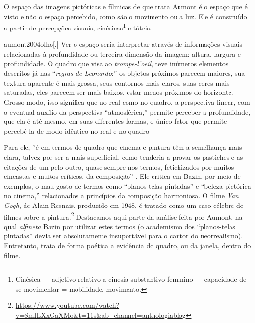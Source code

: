 O espaço das imagens pictóricas e fílmicas de que trata Aumont é o
espaço que é visto e não o espaço percebido, como são o movimento ou a
luz. Ele é construído a partir de percepções visuais,
cinésicas\footnote{Cinésica --- adjetivo relativo a cinesia-substantivo
	feminino --- capacidade de se movimentar = mobilidade, movimento.} e
táteis.

\begin{displaycquote}[113]{aumont2004olho}[.]
	Ver o espaço seria interpretar através de informações visuais
	relacionadas à profundidade ou terceira dimensão da imagem: altura,
	largura e profundidade. O quadro que visa ao \emph{trompe-l'oeil}, teve
	inúmeros elementos descritos já nas \enquote{\emph{regras de Leonardo}:} os
	objetos próximos parecem maiores, sua textura aparente é mais grossa,
	seus contornos mais claros, suas cores mais saturadas, eles parecem ser
	mais baixos, estar menos próximos do horizonte. Grosso modo, isso
	significa que no real como no quadro, a perspectiva linear, com o
	eventual auxílio da perspectiva \enquote{atmosférica,} permite perceber a
	profundidade, que ela é até mesmo, em suas diferentes formas, o único
	fator que permite percebê-la de modo idêntico no real e no quadro
\end{displaycquote}

Para ele, \enquote{é em termos de quadro que cinema e pintura têm a
	semelhança mais clara, talvez por ser a mais superficial, como tenderia
	a provar os pastiches e as citações de um pelo outro, quase sempre nos
	termos, fetichizados por muitos cineastas e muitos críticos, da
	composição} \parencite[123]{aumont2004olho}. Ele critica em Bazin, por meio de
exemplos, o mau gosto de termos como \enquote{planos-telas pintadas} e
\enquote{beleza pictórica no cinema,} relacionados a princípios da
composição harmoniosa. O filme \emph{Van Gogh}, de Alain Resnais,
produzido em 1948, é tratado como um caso célebre de filmes sobre a
pintura.\footnote{\url{https://www.youtube.com/watch?v=SmILXxGaXMo\&t=11s\&ab_channel=anthologiablog}}
Destacamos aqui parte da análise feita por Aumont, na qual
\emph{alfineta} Bazin por utilizar estes termos (o academismo dos
\enquote{planos-telas pintadas} devia ser absolutamente insuportável
para o cantor do neorrealismo). Entretanto, trata de forma poética a
evidência do quadro, ou da janela, dentro do filme.

